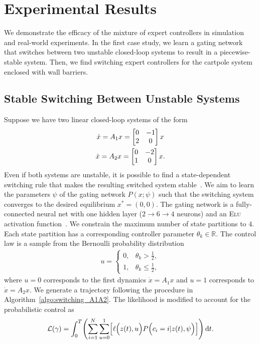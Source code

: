 \section{Experimental Results}
\label{sec:moe_results}
We demonstrate the efficacy of the mixture of expert controllers in simulation
and real-world experiments.
%
In the first case study, we learn a gating network that switches between two
unstable closed-loop systems to result in a piecewise-stable system.
%
Then, we find switching expert controllers for the cartpole system enclosed with
wall barriers.
%

\subsection{Stable Switching Between Unstable Systems}

Suppose we have two linear closed-loop systems of the form 
\begin{equation}
    \begin{gathered}
        \dot{x} = A_1x = \begin{bmatrix}0 & -1 \\ 2 & 0\end{bmatrix}x \\
        \dot{x} = A_2x = \begin{bmatrix}0 & -2 \\ 1 & 0\end{bmatrix}x.
    \end{gathered}
    \label{eq:unstable_closedloop}
\end{equation}
%
Even if both systems are unstable, it is possible to find a state-dependent
switching rule that makes the resulting switched system
stable~\cite{liberzon2003switching}. 
%
We aim to learn the parameters $\psi$ of the gating network $P(x;
\psi)$ such that the switching system converges to the desired equilibrium $x^*
= (0, 0)$.
%
The gating network is a fully-connected neural net with one hidden layer ($2
\rightarrow 6 \rightarrow 4$ neurons) and an \textsc{Elu} activation
function~\cite{clevert2015fast}.
%
We constrain the maximum number of state partitions to $4$.
%
Each state partition has a corresponding controller parameter $\theta_k \in
\mathbb{R}$. 
%
The control law is a sample from the Bernoulli probability distribution
\begin{align}
    u = \begin{cases}
       0, & \theta_k > \frac{1}{2}, \\
       1, & \theta_k \leq \frac{1}{2},
    \end{cases}
\end{align}
\noindent where $u = 0$ corresponds to the first dynamics $\dot{x} = A_1
x$ and $u=1$ corresponds to $\dot{x} = A_2x$.
%
We generate a trajectory following the procedure in
Algorithm~\eqref{algo:switching_A1A2}.
%
The likelihood is modified to account for the probabilistic control as
\begin{align*}
    \mathcal{L}(\gamma) = \int_{0}^{T} \Biggl( \sum_{i=1}^{N} \sum_{u=0}^{1}\Bigl[ \ell \Bigl(z(t), u \Bigr) P\Bigl(c_i = i | z(t), \psi \Bigr) \Bigr] \Biggr) \operatorname{d}\! t.
\end{align*}

